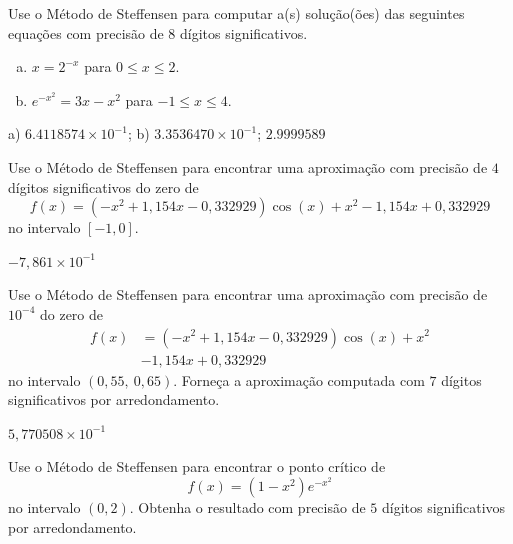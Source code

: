 \begin{exer}
  Use o Método de Steffensen para computar a(s) solução(ões) das seguintes equações com precisão de 8 dígitos significativos.
  \begin{enumerate}[a)]
  \item $x = 2^{-x}$ para $0\leq x \leq 2$.
  \item $e^{-x^2} = 3x - x^2$ para $-1\leq x\leq 4$.
  \end{enumerate}
\end{exer}
\begin{resp}
  a) $6.4118574\times 10^{-1}$; b) $3.3536470\times 10^{-1}$; $2.9999589$
\end{resp}

\begin{exer}
  Use o Método de Steffensen para encontrar uma aproximação com precisão de $4$ dígitos significativos do zero de 
  \begin{equation}
    f(x) = (-x^2+1,154x-0,332929)\cos(x) + x^2 - 1,154x + 0,332929
  \end{equation}
  no intervalo $[-1, 0]$.
\end{exer}
\begin{resp}
  $-7,861\times 10^{-1}$
\end{resp}

\begin{exer}
  Use o Método de Steffensen para encontrar uma aproximação com precisão de $10^{-4}$ do zero de
  \begin{equation}
    \begin{aligned}
      f(x) &= (-x^2+1,154x-0,332929)\cos(x) + x^2 \\
      &- 1,154x + 0,332929
  \end{aligned}
  \end{equation}
no intervalo $(0,55, ~0,65)$. Forneça a aproximação computada com $7$ dígitos significativos por arredondamento.
\end{exer}
\begin{resp}
  $5,770508\times 10^{-1}$
\end{resp}

\begin{exer}
  Use o Método de Steffensen para encontrar o ponto crítico de
  \begin{equation}
    f(x) = (1-x^2)e^{-x^2}
  \end{equation}
  no intervalo $(0, 2)$. Obtenha o resultado com precisão de $5$ dígitos significativos por arredondamento.
\end{exer}

